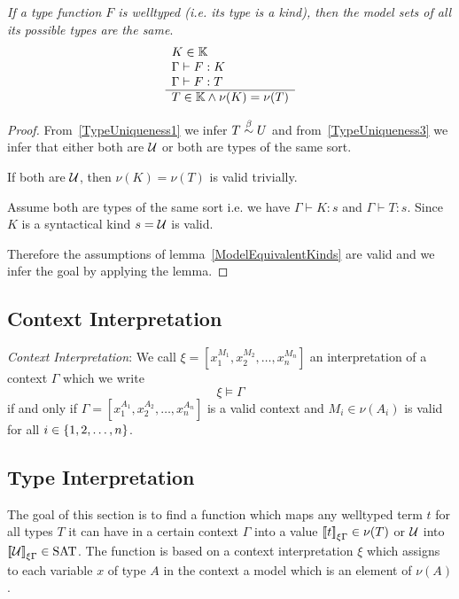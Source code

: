 \begin{theorem}
    \label{ModelAllTypesSame}
    \emph{If a type function $F$ is welltyped (i.e. its type is a kind), then
    the model sets of all its possible types are the same}.
    $$
    \begin{array}{l} 
        K \in \mathbb{K}
        \\
        \Gamma \vdash F: K
        \\
        \Gamma \vdash F: T
     \\ \hline 
        T \in \mathbb{K} \land \nu(K) = \nu(T)
    \end{array}
    $$

    \begin{proof}
        From~\ref{TypeUniqueness1} we infer $T \stackrel{\beta}{\sim} U$ and
        from~\ref{TypeUniqueness3} we infer that either both are ${\cal U}$ or both
        are types of the same sort.

        If both are ${\cal U}$, then $\nu(K) = \nu(T)$ is valid trivially.

        Assume both are types of the same sort i.e. we have $\Gamma \vdash K: s$
        and $\Gamma \vdash T: s$. Since $K$ is a syntactical kind $s = {\cal U}$ is
        valid.

        Therefore the assumptions of lemma~\ref{ModelEquivalentKinds} are valid
        and we infer the goal by applying the lemma.
    \end{proof}
\end{theorem}




\subsection{Context Interpretation}

\begin{definition}
    \emph{Context Interpretation}:
    We call $\xi = [x_1^{M_1}, x_2^{M_2}, \ldots, x_n^{M_n}]$ an interpretation
    of a context $\Gamma$ which we write
    $$
        \xi \vDash \Gamma
    $$
    if and only if $\Gamma = [x_1^{A_1}, x_2^{A_2}, \ldots, x_n^{A_n}]$ is a
    valid context and $M_i \in \nu(A_i)$ is valid for all $i \in {\{1, 2,
    \ldots, n\}}$.
\end{definition}



\subsection{Type Interpretation}

The goal of this section is to find a function which maps any welltyped term $t$
for all types $T$ it can have in a certain context $\Gamma$ into a value
${{[\![} t{]\!]}}_{\xi\Gamma} \in \nu (T)$ or ${\cal U}$ into
${{[\![} {\cal U}{]\!]}}_{\xi\Gamma} \in \text{SAT}$. The function is based on a context
interpretation $\xi$ which assigns to each variable $x$ of type $A$ in the
context a model which is an element of $\nu(A)$.

